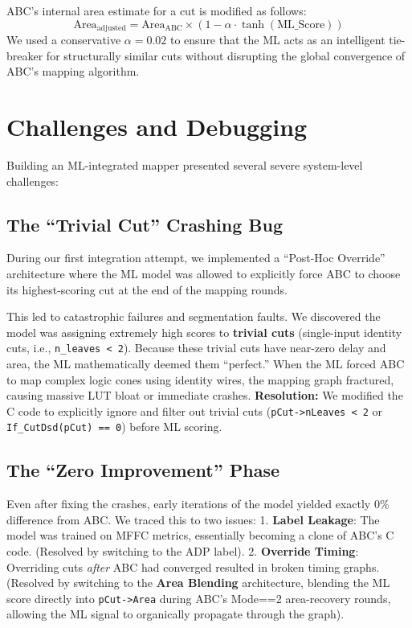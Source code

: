 \documentclass[11pt,a4paper]{article}
\begin{document}
ABC's internal area estimate for a cut is modified as follows:
\[ \text{Area}_{\text{adjusted}} = \text{Area}_{\text{ABC}} \times \left(1 - \alpha \cdot \tanh(\text{ML\_Score})\right) \]
We used a conservative $\alpha = 0.02$ to ensure that the ML acts as an intelligent tie-breaker for structurally similar cuts without disrupting the global convergence of ABC's mapping algorithm.

\section{Challenges and Debugging}

Building an ML-integrated mapper presented several severe system-level challenges:

\subsection{The ``Trivial Cut'' Crashing Bug}
During our first integration attempt, we implemented a ``Post-Hoc Override'' architecture where the ML model was allowed to explicitly force ABC to choose its highest-scoring cut at the end of the mapping rounds. 

This led to catastrophic failures and segmentation faults. We discovered the model was assigning extremely high scores to \textbf{trivial cuts} (single-input identity cuts, i.e., \texttt{n\_leaves < 2}). Because these trivial cuts have near-zero delay and area, the ML mathematically deemed them ``perfect.'' When the ML forced ABC to map complex logic cones using identity wires, the mapping graph fractured, causing massive LUT bloat or immediate crashes. 
\textbf{Resolution:} We modified the C code to explicitly ignore and filter out trivial cuts (\texttt{pCut->nLeaves < 2} or \texttt{If\_CutDsd(pCut) == 0}) before ML scoring. 

\subsection{The ``Zero Improvement'' Phase}
Even after fixing the crashes, early iterations of the model yielded exactly 0\% difference from ABC. We traced this to two issues:
1. \textbf{Label Leakage}: The model was trained on MFFC metrics, essentially becoming a clone of ABC's C code. (Resolved by switching to the ADP label).
2. \textbf{Override Timing}: Overriding cuts \textit{after} ABC had converged resulted in broken timing graphs. (Resolved by switching to the \textbf{Area Blending} architecture, blending the ML score directly into \texttt{pCut->Area} during ABC's Mode==2 area-recovery rounds, allowing the ML signal to organically propagate through the graph).
\end{document}
